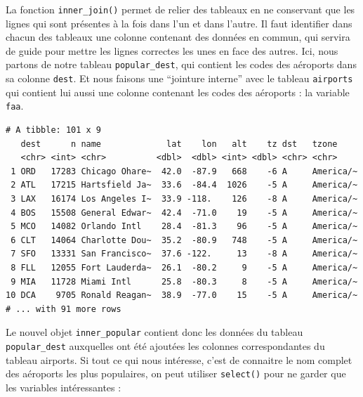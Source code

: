 \documentclass[a4paperpaper,]{article}
\newenvironment{Shaded}{\begin{snugshade}}{\end{snugshade}}
\newcommand{\DataTypeTok}[1]{\textcolor[rgb]{0.00,0.34,0.68}{#1}}
\newcommand{\KeywordTok}[1]{\textcolor[rgb]{0.12,0.11,0.11}{\textbf{#1}}}
\newcommand{\NormalTok}[1]{\textcolor[rgb]{0.12,0.11,0.11}{#1}}
\newcommand{\OperatorTok}[1]{\textcolor[rgb]{0.12,0.11,0.11}{#1}}
\newcommand{\StringTok}[1]{\textcolor[rgb]{0.75,0.01,0.01}{#1}}
\begin{document}
La fonction \texttt{inner\_join()} permet de relier des tableaux en ne conservant que les lignes qui sont présentes à la fois dans l'un et dans l'autre. Il faut identifier dans chacun des tableaux une colonne contenant des données en commun, qui servira de guide pour mettre les lignes correctes les unes en face des autres. Ici, nous partons de notre tableau \texttt{popular\_dest}, qui contient les codes des aéroports dans sa colonne \texttt{dest}. Et nous faisons une ``jointure interne'' avec le tableau \texttt{airports} qui contient lui aussi une colonne contenant les codes des aéroports : la variable \texttt{faa}.

\begin{Shaded}
\end{Shaded}

\begin{verbatim}
# A tibble: 101 x 9
   dest      n name             lat    lon   alt    tz dst   tzone    
   <chr> <int> <chr>          <dbl>  <dbl> <int> <dbl> <chr> <chr>    
 1 ORD   17283 Chicago Ohare~  42.0  -87.9   668    -6 A     America/~
 2 ATL   17215 Hartsfield Ja~  33.6  -84.4  1026    -5 A     America/~
 3 LAX   16174 Los Angeles I~  33.9 -118.    126    -8 A     America/~
 4 BOS   15508 General Edwar~  42.4  -71.0    19    -5 A     America/~
 5 MCO   14082 Orlando Intl    28.4  -81.3    96    -5 A     America/~
 6 CLT   14064 Charlotte Dou~  35.2  -80.9   748    -5 A     America/~
 7 SFO   13331 San Francisco~  37.6 -122.     13    -8 A     America/~
 8 FLL   12055 Fort Lauderda~  26.1  -80.2     9    -5 A     America/~
 9 MIA   11728 Miami Intl      25.8  -80.3     8    -5 A     America/~
10 DCA    9705 Ronald Reagan~  38.9  -77.0    15    -5 A     America/~
# ... with 91 more rows
\end{verbatim}

Le nouvel objet \texttt{inner\_popular} contient donc les données du tableau \texttt{popular\_dest} auxquelles ont été ajoutées les colonnes correspondantes du tableau airports. Si tout ce qui nous intéresse, c'est de connaitre le nom complet des aéroports les plus populaires, on peut utiliser \texttt{select()} pour ne garder que les variables intéressantes :
\end{document}
